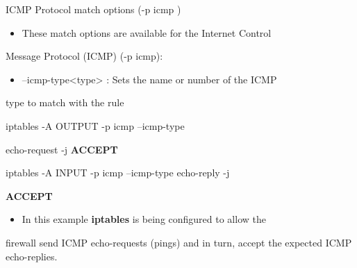 \begin{frame}[t,allowframebreaks]{ICMP Protocol match options (-p icmp )}
  \fontsize{15}{18}\selectfont
  \begin{itemize}
    \item These match options are available for the Internet Control
  \end{itemize}
  Message Protocol (ICMP) (-p icmp):\par
  \begin{itemize}
    \item --icmp-type<type> : Sets the name or number of the ICMP
  \end{itemize}
  type to match with the rule\par
  \vspace{0.08cm}
  {\color{CommandGreen}\ttfamily\fontsize{13.5}{16.5}\selectfont iptables -A OUTPUT -p icmp --icmp-type\par}
  echo-request -j \textcolor{WarningColor}{\bfseries ACCEPT}\par
  \vspace{0.08cm}
  {\color{CommandGreen}\ttfamily\fontsize{13.5}{16.5}\selectfont iptables -A INPUT -p icmp --icmp-type echo-reply -j\par}
  \textcolor{WarningColor}{\bfseries ACCEPT}\par
  \begin{itemize}
    \item In this example \textcolor{CommandGreen}{\bfseries iptables} is being configured to allow the
  \end{itemize}
  firewall send ICMP echo-requests (pings) and in turn, accept the expected ICMP echo-replies.\par
\end{frame}
